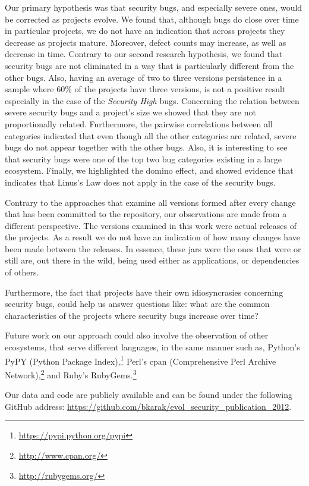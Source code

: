 \documentclass[conference]{llncs}
\begin{document}
Our primary hypothesis was that security bugs, and especially severe
ones, would be corrected as projects evolve. We found that, although
bugs do close over time in particular projects, we do not have an indication that across
projects they decrease as projects mature. Moreover, defect counts may
increase, as well as decrease in time. Contrary to our second research hypothesis,
we found that security
bugs are not eliminated in a way that is particularly different from the other bugs.
Also, having an average of two to three versions persistence in a sample where 60\%
of the projects have three versions, is not a positive result especially in the
case of the {\it Security High} bugs. Concerning the relation between severe security bugs and a project's size
we showed that they are not proportionally related. Furthermore, the
pairwise correlations between all categories indicated that even though all the other
categories are related, severe bugs do not appear together with the other bugs.
Also, it is interesting to see that security bugs were one of the top two
bug categories existing in a large ecosystem. Finally, we highlighted the
domino effect, and showed evidence that indicates that Linus's Law does not
apply in the case of the security bugs.

Contrary to the approaches that examine all versions
formed after every change that has been committed to the repository,
our observations are made from a different perspective.
The versions examined in this work were actual releases
of the projects. As a result we do not have an indication of how many changes
have been made between the releases.
In essence, these {\sc jar}s were the ones that were or still are,
out there in the wild, being used either as applications,
or dependencies of others.

Furthermore, the fact that projects have their own idiosyncrasies concerning
security bugs, could help us answer questions like: what are the common
characteristics of the projects where security bugs increase over time?

Future work on our approach could also involve the observation of other ecosystems, that
serve different languages, in the same manner such as, Python's PyPY
(Python Package Index),\footnote{\url{https://pypi.python.org/pypi}}
Perl's {\sc cpan} (Comprehensive Perl Archive Network),\footnote{\url{http://www.cpan.org/}}
and Ruby's RubyGems.\footnote{\url{http://rubygems.org/}}

Our data and code are publicly available and can be found under the following
GitHub address: \url{https://github.com/bkarak/evol_security_publication_2012}.
\end{document}
